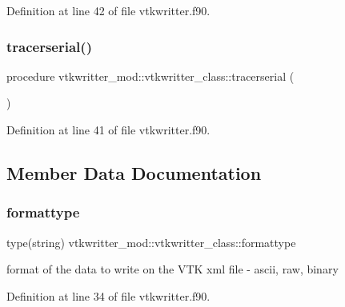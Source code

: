 Definition at line 42 of file vtkwritter.\+f90.

\mbox{\label{structvtkwritter__mod_1_1vtkwritter__class_ad87da7194456a9b70f60f53f19a5c47b}} 
\subsubsection{\texorpdfstring{tracerserial()}{tracerserial()}}
{\footnotesize\ttfamily procedure vtkwritter\+\_\+mod\+::vtkwritter\+\_\+class\+::tracerserial (\begin{DoxyParamCaption}{ }\end{DoxyParamCaption})\hspace{0.3cm}{\ttfamily [private]}}



Definition at line 41 of file vtkwritter.\+f90.



\subsection{Member Data Documentation}
\mbox{\label{structvtkwritter__mod_1_1vtkwritter__class_a1488d11c6ab4adaf97a2eac301bab694}} 
\subsubsection{\texorpdfstring{formattype}{formattype}}
{\footnotesize\ttfamily type(string) vtkwritter\+\_\+mod\+::vtkwritter\+\_\+class\+::formattype\hspace{0.3cm}{\ttfamily [private]}}



format of the data to write on the V\+TK xml file -\/ ascii, raw, binary 



Definition at line 34 of file vtkwritter.\+f90.


